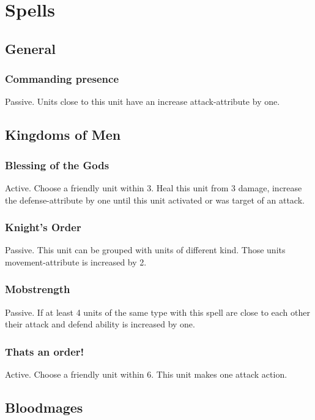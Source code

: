 \documentclass[a5paper,pagesize,10pt,bibtotoc,pointlessnumbers,
normalheadings,DIV=9,twoside=false]{scrbook}
\begin{document}
\section{Spells}

\subsection{General}

\subsubsection{Commanding presence}
Passive. Units close to this unit have an increase attack-attribute by one.


\newpage
\subsection{Kingdoms of Men}

\subsubsection{Blessing of the Gods}
Active. Choose a friendly unit within 3. Heal this unit from 3 damage, increase the defense-attribute by one until this unit activated or was target of an attack.

\subsubsection{Knight's Order}
Passive. This unit can be grouped with units of different kind. Those units movement-attribute is increased by 2.

\subsubsection{Mobstrength}
Passive. If at least 4 units of the same type with this spell are close to each other their attack and defend ability is increased by one.

\subsubsection{Thats an order!}
Active. Choose a friendly unit within 6. This unit makes one attack action.

\newpage
\subsection{Bloodmages}
\end{document}
